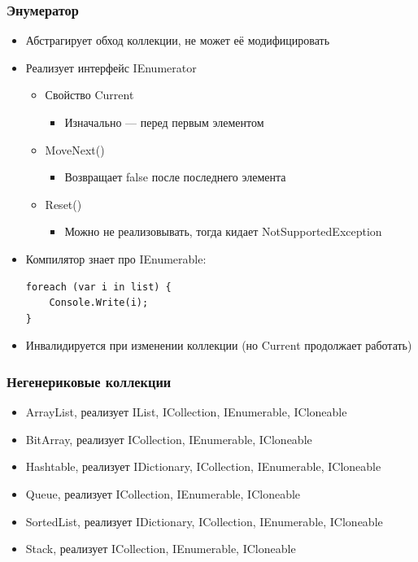 \documentclass[xetex,mathserif,serif]{beamer}
\begin{document}
	\begin{frame}[fragile]
		\frametitle{Энумератор}
		\begin{itemize}
			\item Абстрагирует обход коллекции, не может её модифицировать
			\item Реализует интерфейс IEnumerator
			\begin{itemize}
				\item Свойство Current
				\begin{itemize}
					\item Изначально --- перед первым элементом
				\end{itemize}
				\item MoveNext()
				\begin{itemize}
					\item Возвращает false после последнего элемента
				\end{itemize}
				\item Reset()
				\begin{itemize}
					\item Можно не реализовывать, тогда кидает NotSupportedException
				\end{itemize}
			\end{itemize}
			\item Компилятор знает про IEnumerable:
			\begin{verbatim}
foreach (var i in list) { 
    Console.Write(i); 
}
			\end{verbatim}
			\item Инвалидируется при изменении коллекции (но Current продолжает работать)
		\end{itemize}
	\end{frame}

	\begin{frame}
		\frametitle{Негенериковые коллекции}
		\begin{itemize}
			\item ArrayList, реализует IList, ICollection, IEnumerable, ICloneable
			\item BitArray,  реализует ICollection, IEnumerable, ICloneable
			\item Hashtable, реализует IDictionary, ICollection, IEnumerable, ICloneable
			\item Queue, реализует ICollection, IEnumerable, ICloneable
			\item SortedList, реализует IDictionary, ICollection, IEnumerable, ICloneable
			\item Stack, реализует ICollection, IEnumerable, ICloneable
		\end{itemize}
	\end{frame}
\end{document}
